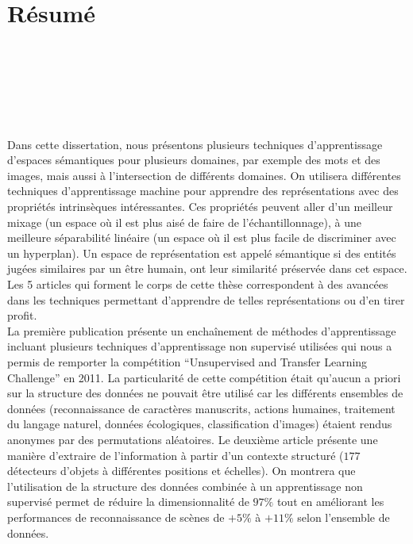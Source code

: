 \chapter*{Résumé\\~~~~~~~~\\~~~~~~~~~~~\\~~~~~~~~~~}

\vspace{-4cm}

Dans cette dissertation, nous présentons plusieurs techniques d'apprentissage
d'espaces sémantiques pour plusieurs domaines, par exemple des mots et des
images, mais aussi à l'intersection de différents domaines.  On utilisera
différentes techniques d'apprentissage machine pour apprendre des
représentations avec des propriétés intrinsèques intéressantes. Ces propriétés
peuvent aller d'un meilleur mixage (un espace où il est plus aisé de faire de
l'échantillonnage), à une meilleure séparabilité linéaire (un espace où il est
plus facile de discriminer avec un hyperplan). Un espace de représentation est appelé sémantique
si des entités jugées similaires par un être humain, ont leur similarité
préservée dans cet espace.  Les 5 articles qui forment le corps de cette thèse
correspondent à des avancées dans les techniques permettant d'apprendre de
telles représentations ou d'en tirer profit.  
\\

\vspace{-0.2cm}
La première publication présente un enchaînement de méthodes d'apprentissage
incluant plusieurs techniques d'apprentissage non supervisé utilisées qui nous a permis de
remporter la compétition ``Unsupervised and Transfer Learning Challenge'' en 2011. La particularité de cette compétition était
qu'aucun a priori sur la structure des données ne pouvait être utilisé car les
différents ensembles de données (reconnaissance de caractères manuscrits,
actions humaines, traitement du langage naturel, données écologiques,
classification d'images) étaient rendus anonymes par des permutations
aléatoires. Le deuxième article présente une manière d'extraire de l'information à
partir d'un contexte structuré ($177$ détecteurs d'objets à différentes
positions et échelles). On montrera que l'utilisation de la structure des
données combinée à un apprentissage non supervisé permet de réduire la
dimensionnalité de $97\%$ tout en améliorant les performances de
reconnaissance de scènes de $+5\%$ à $+11\%$ selon l'ensemble de données.
\\

